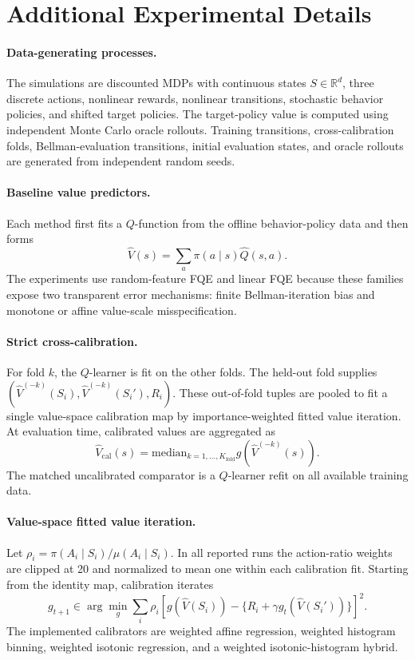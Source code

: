 \section{Additional Experimental Details}
\label{app:experiments}

\paragraph{Data-generating processes.}
The simulations are discounted MDPs with continuous states
\(S\in\mathbb{R}^d\), three discrete actions, nonlinear rewards, nonlinear
transitions, stochastic behavior policies, and shifted target policies. The
target-policy value is computed using independent Monte Carlo oracle rollouts.
Training transitions, cross-calibration folds, Bellman-evaluation transitions, initial
evaluation states, and oracle rollouts are generated from independent random
seeds.

\paragraph{Baseline value predictors.}
Each method first fits a \(Q\)-function from the offline behavior-policy data
and then forms
\[
  \widehat V(s)=\sum_a \pi(a\mid s)\widehat Q(s,a).
\]
The experiments use random-feature FQE and linear FQE because these families
expose two transparent error mechanisms: finite Bellman-iteration bias and
monotone or affine value-scale misspecification.

\paragraph{Strict cross-calibration.}
For fold \(k\), the \(Q\)-learner is fit on the other folds. The held-out fold
supplies \((\widehat V^{(-k)}(S_i),\widehat V^{(-k)}(S_i'),R_i)\). These
out-of-fold tuples are pooled to fit a single value-space calibration map by
importance-weighted fitted value iteration. At evaluation time, calibrated
values are aggregated as
\[
  \widehat V_{\mathrm{cal}}(s)
  =
  \mathrm{median}_{k=1,\ldots,K_{\mathrm{fold}}}
  g\!\left(\widehat V^{(-k)}(s)\right).
\]
The matched uncalibrated comparator is a \(Q\)-learner refit on all available
training data.

\paragraph{Value-space fitted value iteration.}
Let \(\rho_i=\pi(A_i\mid S_i)/\mu(A_i\mid S_i)\). In all reported runs the
action-ratio weights are clipped at 20 and normalized to mean one within each
calibration fit. Starting from the identity map, calibration iterates
\[
  g_{t+1}\in\arg\min_g\sum_i \rho_i
  \left[g(\widehat V(S_i))-\{R_i+\gamma g_t(\widehat V(S_i'))\}\right]^2.
\]
The implemented calibrators are weighted affine regression, weighted histogram
binning, weighted isotonic regression, and a weighted isotonic-histogram
hybrid.


